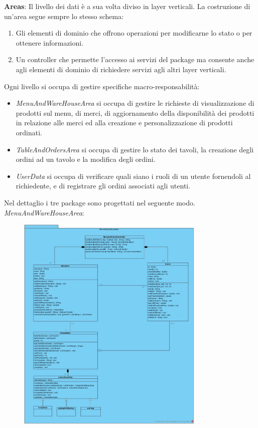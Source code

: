 \textbf{Areas}:
Il livello dei dati è a sua volta diviso in layer verticali. La costruzione di un’area segue sempre lo stesso schema:
\begin{enumerate}
	\item Gli elementi di dominio che offrono operazioni per modificarne lo stato o per ottenere informazioni.
	\item Un controller che permette l’accesso ai servizi del package ma consente anche agli elementi di dominio di richiedere servizi agli altri layer verticali.
\end{enumerate}
Ogni livello si occupa di gestire specifiche macro-responsabilità:
\begin{itemize}
	\item \textit{MenuAndWareHouseArea} si occupa di gestire le richieste di visualizzazione di prodotti sul menu, di merci, di aggiornamento della disponibilità dei prodotti in relazione alle merci ed alla creazione e personalizzazione di prodotti ordinati.
	\item \textit{TableAndOrdersArea} si occupa di gestire lo stato dei tavoli, la creazione degli ordini ad un tavolo e la modifica degli ordini.
	\item \textit{UserData} si occupa di verificare quali siano i ruoli di un utente fornendoli al richiedente, e di registrare gli ordini associati agli utenti.
\end{itemize}
Nel dettaglio i tre package sono progettati nel seguente modo.
\vspace{0.5cm}
\\\textit{MenuAndWareHouseArea}:
\begin{figure}[H]
	\centering
	\includegraphics[width=0.8\textwidth]{Immagini/MenuAndWareHouseArea.jpg}
\end{figure}
